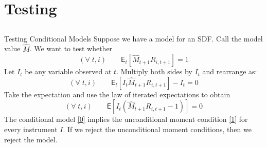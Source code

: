 \documentclass[10pt]{beamer}
\newcommand{\mye}{\ensuremath{\mathsf{E}}}
\begin{document}
\section{Testing}\subsection{}
\begin{frame}{Testing Conditional Models}
Suppose we have a model for an SDF.  Call the model value $\hat M$.  We want to test whether
\begin{equation}\label{0}\tag{$\star$}
(\forall\;t, i) \qquad \mye_t[\hat M_{t+1}R_{i,t+1}] = 1
\end{equation}
Let $I_t$ be any variable observed at $t$.  Multiply both sides by $I_t$ and rearrange as:
$$(\forall\;t, i) \qquad \mye_t[I_t\hat M_{t+1}R_{i,t+1}] -I_t =0$$
Take the expectation and use the law of iterated expectations to obtain
\begin{equation}\label{1}\tag{$\star\star$}
(\forall\;t, i) \qquad \mye[I_t(\hat M_{t+1}R_{i,t+1} -1)] =0
\end{equation}
The conditional model \eqref{0} implies the unconditional moment condition \eqref{1} for every \alert{instrument} $I$.  If we reject the unconditional moment conditions, then we reject the model. 
\end{frame}
\end{document}
